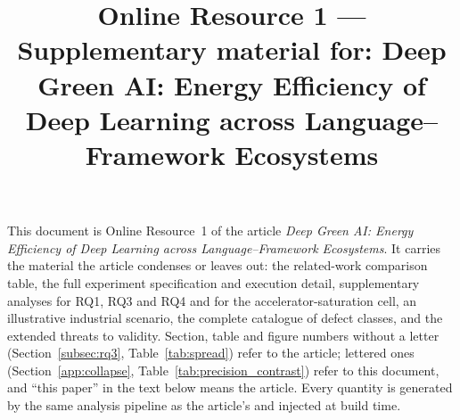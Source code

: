 \documentclass[pdflatex,sn-basic]{sn-jnl}
\newcommand{\paperroot}{../}
\begin{document}
\title{Online Resource 1 --- Supplementary material for: Deep Green AI: Energy Efficiency of Deep Learning across Language--Framework Ecosystems}

\author*[1]{ }
\author*[1]{ }
\author[1]{ }
\author[1]{ }


\maketitle

\noindent This document is Online Resource~1 of the article \emph{Deep Green
AI: Energy Efficiency of Deep Learning across Language--Framework Ecosystems}.
It carries the material the article condenses or leaves out: the related-work
comparison table, the full experiment specification and execution detail,
supplementary analyses for RQ1, RQ3 and RQ4 and for the accelerator-saturation
cell, an illustrative industrial scenario, the complete catalogue of defect
classes, and the extended threats to validity. Section, table and figure
numbers without a letter (Section~\ref{subsec:rq3}, Table~\ref{tab:spread})
refer to the article; lettered ones (Section~\ref{app:collapse},
Table~\ref{tab:precision_contrast}) refer to this document, and ``this paper''
in the text below means the article. Every quantity is
generated by the same analysis pipeline as the article's and injected at build
time.



\setcounter{secnumdepth}{3}
\backmatter

\end{document}
